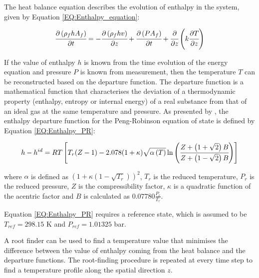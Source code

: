 \documentclass[a4paper,fleqn]{cas-dc}
\begin{document}
		The heat balance equation describes the evolution of enthalpy in the system, given by Equation \ref{EQ:Enthalpy_equation}:
		
		{\footnotesize
			\begin{equation} \label{EQ:Enthalpy_equation}
				\cfrac{\partial \left(\rho_f {\color{black}h} A_f\right)}{\partial t} = - \cfrac{\partial \left( \rho_f {\color{black}h}  v \right)}{\partial z} + \cfrac{\partial \left(P A_f\right)}{\partial t} + \cfrac{\partial}{\partial z} \left( k \cfrac{\partial T}{\partial z} \right)
			\end{equation}
		}
		
		If the value of enthalpy $h$ is known from the time evolution of the energy equation and pressure $P$ is known from measurement, then the temperature $T$ can be reconstructed based on the departure function. The departure function is a mathematical function that characterises the deviation of a thermodynamic property (enthalpy, entropy or internal energy) of a real substance from that of an ideal gas at the same temperature and pressure. As presented by \citet{Gmehling2019}, the enthalpy departure function for the Peng-Robinson equation of state is defined by Equation \ref{EQ:Enthalpy_PR}:
		
		{\footnotesize
			\begin{equation}
				{\color{black}h}-{\color{black}h}^{id}={\color{black}R}T \left[{\color{black}T_r}({\color{black}Z}-1) -2.078(1+{\color{black}\kappa} ){\sqrt { {\color{black}\alpha}\left(T\right) } } \ln \left(\cfrac{{\color{black}Z}+\left( 1+\sqrt{2} \right){\color{black}B}}{{\color{black}Z}+\left( 1-\sqrt{2} \right){\color{black}B}}\right)\right]
				\label{EQ:Enthalpy_PR}
			\end{equation}				
		}
		
		where $\alpha$ is defined as $\left( 1+\kappa \left( 1 - \sqrt{T_r} \right) \right)^2$, $T_r$ is the reduced temperature, $P_r$ is the reduced pressure, $Z$ is the compressibility factor, $\kappa$ is a quadratic function of the acentric factor and $B$ is calculated as $0.07780\frac{P_r}{T_r}$.
		
		Equation \ref{EQ:Enthalpy_PR} requires a reference state, which is assumed to be $T_{ref}=298.15$ K and $P_{ref}=1.01325$ bar.
		
		A root finder can be used to find a temperature value that minimises the difference between the value of enthalpy coming from the heat balance and the departure functions. The root-finding procedure is repeated at every time step to find a temperature profile along the spatial direction $z$.
		
\end{document}
